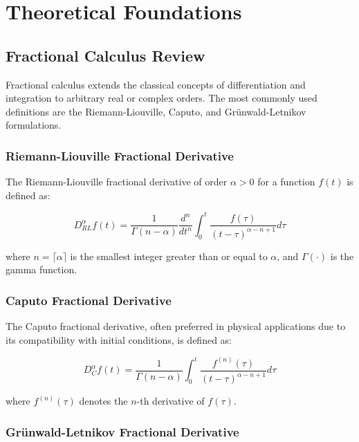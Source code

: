 \section{Theoretical Foundations}

\subsection{Fractional Calculus Review}

Fractional calculus extends the classical concepts of differentiation and integration to arbitrary real or complex orders. The most commonly used definitions are the Riemann-Liouville, Caputo, and Grünwald-Letnikov formulations.

\subsubsection{Riemann-Liouville Fractional Derivative}

The Riemann-Liouville fractional derivative of order $\alpha > 0$ for a function $f(t)$ is defined as:

\begin{equation}
D^{\alpha}_{RL} f(t) = \frac{1}{\Gamma(n-\alpha)} \frac{d^n}{dt^n} \int_0^t \frac{f(\tau)}{(t-\tau)^{\alpha-n+1}} d\tau
\end{equation}

where $n = \lceil \alpha \rceil$ is the smallest integer greater than or equal to $\alpha$, and $\Gamma(\cdot)$ is the gamma function.

\subsubsection{Caputo Fractional Derivative}

The Caputo fractional derivative, often preferred in physical applications due to its compatibility with initial conditions, is defined as:

\begin{equation}
D^{\alpha}_C f(t) = \frac{1}{\Gamma(n-\alpha)} \int_0^t \frac{f^{(n)}(\tau)}{(t-\tau)^{\alpha-n+1}} d\tau
\end{equation}

where $f^{(n)}(\tau)$ denotes the $n$-th derivative of $f(\tau)$.

\subsubsection{Grünwald-Letnikov Fractional Derivative}

